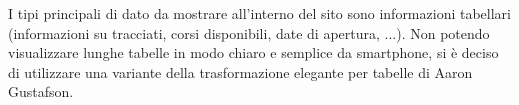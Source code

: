 I tipi principali di dato da mostrare all'interno del sito sono informazioni tabellari (informazioni su tracciati, corsi disponibili, date di apertura, ...). Non potendo visualizzare lunghe tabelle in modo chiaro e semplice da smartphone, si è deciso di utilizzare una variante della trasformazione elegante per tabelle di Aaron Gustafson.